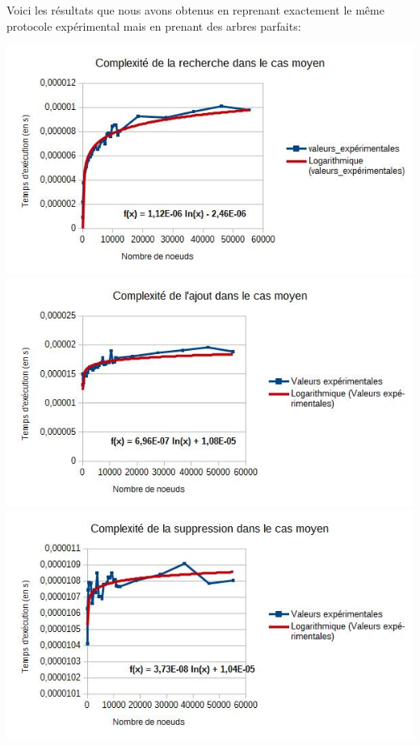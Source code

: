 \documentclass{report}
\begin{document}
Voici les résultats que nous avons obtenus en reprenant exactement le même protocole expérimental mais en prenant des arbres parfaits: 

\includegraphics[scale=0.75]{images/rech2.jpg} \\
\includegraphics[scale=0.75]{images/ajout2.jpg} \\
\includegraphics[scale=0.75]{images/supp2.jpg}
\end{document}

